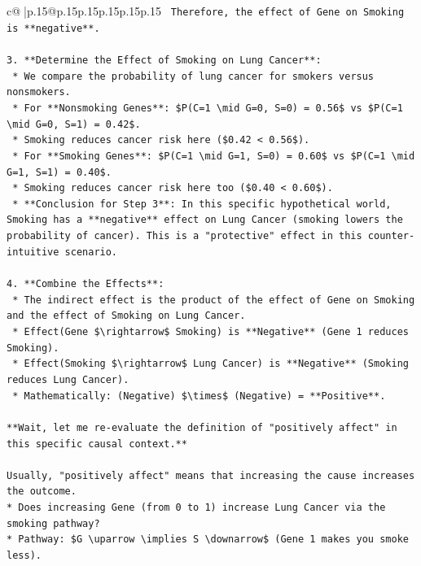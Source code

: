 \documentclass{article}
\begin{document}
{\begin{supertabular}{c@{$\;$}|p{.15\linewidth}@{}p{.15\linewidth}p{.15\linewidth}p{.15\linewidth}p{.15\linewidth}p{.15\linewidth}}
{{{\texttt{        Therefore, the effect of Gene on Smoking is **negative**.} \\
\\ 
\texttt{3.  **Determine the Effect of Smoking on Lung Cancer**:} \\
\texttt{    *   We compare the probability of lung cancer for smokers versus nonsmokers.} \\
\texttt{    *   For **Nonsmoking Genes**: \$P(C=1 \textbackslash{}mid G=0, S=0) = 0.56\$ vs \$P(C=1 \textbackslash{}mid G=0, S=1) = 0.42\$.} \\
\texttt{        *   Smoking reduces cancer risk here (\$0.42 < 0.56\$).} \\
\texttt{    *   For **Smoking Genes**: \$P(C=1 \textbackslash{}mid G=1, S=0) = 0.60\$ vs \$P(C=1 \textbackslash{}mid G=1, S=1) = 0.40\$.} \\
\texttt{        *   Smoking reduces cancer risk here too (\$0.40 < 0.60\$).} \\
\texttt{    *   **Conclusion for Step 3**: In this specific hypothetical world, Smoking has a **negative** effect on Lung Cancer (smoking lowers the probability of cancer). This is a "protective" effect in this counter{-}intuitive scenario.} \\
\\ 
\texttt{4.  **Combine the Effects**:} \\
\texttt{    *   The indirect effect is the product of the effect of Gene on Smoking and the effect of Smoking on Lung Cancer.} \\
\texttt{    *   Effect(Gene \$\textbackslash{}rightarrow\$ Smoking) is **Negative** (Gene 1 reduces Smoking).} \\
\texttt{    *   Effect(Smoking \$\textbackslash{}rightarrow\$ Lung Cancer) is **Negative** (Smoking reduces Lung Cancer).} \\
\texttt{    *   Mathematically: (Negative) \$\textbackslash{}times\$ (Negative) = **Positive**.} \\
\\ 
\texttt{**Wait, let me re{-}evaluate the definition of "positively affect" in this specific causal context.**} \\
\\ 
\texttt{Usually, "positively affect" means that increasing the cause increases the outcome.} \\
\texttt{*   Does increasing Gene (from 0 to 1) increase Lung Cancer via the smoking pathway?} \\
\texttt{*   Pathway: \$G \textbackslash{}uparrow \textbackslash{}implies S \textbackslash{}downarrow\$ (Gene 1 makes you smoke less).} \\
}}}
\end{supertabular}}
\end{document}
